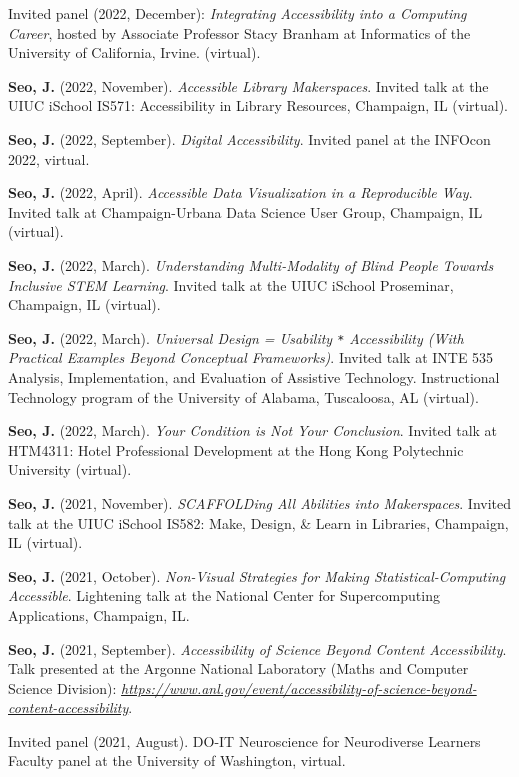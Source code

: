 \documentclass[11pt,a4paper,]{awesome-cv}
\begin{document}
Invited panel (2022, December): \emph{Integrating Accessibility into a
Computing Career}, hosted by Associate Professor Stacy Branham at
Informatics of the University of California, Irvine. (virtual).

\textbf{Seo, J.} (2022, November). \emph{Accessible Library
Makerspaces}. Invited talk at the UIUC iSchool IS571: Accessibility in
Library Resources, Champaign, IL (virtual).

\textbf{Seo, J.} (2022, September). \emph{Digital Accessibility}.
Invited panel at the INFOcon 2022, virtual.

\textbf{Seo, J.} (2022, April). \emph{Accessible Data Visualization in a
Reproducible Way}. Invited talk at Champaign-Urbana Data Science User
Group, Champaign, IL (virtual).

\textbf{Seo, J.} (2022, March). \emph{Understanding Multi-Modality of
Blind People Towards Inclusive STEM Learning}. Invited talk at the UIUC
iSchool Proseminar, Champaign, IL (virtual).

\textbf{Seo, J.} (2022, March). \emph{Universal Design = Usability
\texttt{*} Accessibility (With Practical Examples Beyond Conceptual
Frameworks)}. Invited talk at INTE 535 Analysis, Implementation, and
Evaluation of Assistive Technology. Instructional Technology program of
the University of Alabama, Tuscaloosa, AL (virtual).

\textbf{Seo, J.} (2022, March). \emph{Your Condition is Not Your
Conclusion}. Invited talk at HTM4311: Hotel Professional Development at
the Hong Kong Polytechnic University (virtual).

\textbf{Seo, J.} (2021, November). \emph{SCAFFOLDing All Abilities into
Makerspaces}. Invited talk at the UIUC iSchool IS582: Make, Design, \&
Learn in Libraries, Champaign, IL (virtual).

\textbf{Seo, J.} (2021, October). \emph{Non-Visual Strategies for Making
Statistical-Computing Accessible}. Lightening talk at the National
Center for Supercomputing Applications, Champaign, IL.

\textbf{Seo, J.} (2021, September). \emph{Accessibility of Science
Beyond Content Accessibility}. Talk presented at the Argonne National
Laboratory (Maths and Computer Science Division):
\emph{\url{https://www.anl.gov/event/accessibility-of-science-beyond-content-accessibility}}.

Invited panel (2021, August). DO-IT Neuroscience for Neurodiverse
Learners Faculty panel at the University of Washington, virtual.
\end{document}
